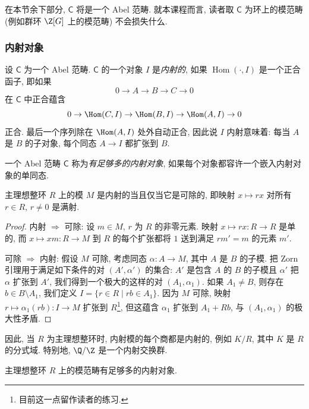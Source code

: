 在本节余下部分, $\mathsf{C}$ 将是一个 Abel 范畴. 就本课程而言, 读者取 $\mathsf{C}$ 为环上的模范畴 (例如群环 $\Z[G]$ 上的模范畴) 不会损失什么.

\subsubsection*{内射对象}

设 $\mathsf{C}$ 为一个 Abel 范畴. $\mathsf{C}$ 的一个对象 $I$ 是\emph{内射的}, 如果 $\operatorname{Hom}(\cdot,I)$ 是一个正合函子, 即如果
\[
 0\to A\to B\to C\to 0
\]
在 $\mathsf{C}$ 中正合蕴含
\[
 0\to \Hom(C,I)\to \Hom(B,I)\to \Hom(A,I)\to 0
\]
正合. 最后一个序列除在 $\Hom(A,I)$ 处外自动正合, 因此说 $I$ 内射意味着: 每当 $A$ 是 $B$ 的子对象, 每个同态 $A\to I$ 都扩张到 $B$.

一个 Abel 范畴 $\mathsf{C}$ 称为\emph{有足够多的内射对象}, 如果每个对象都容许一个嵌入内射对象的单同态.

\begin{proposition}\label{prop:ii.A.3}
主理想整环 $R$ 上的模 $M$ 是内射的当且仅当它是可除的, 即映射 $x\mapsto rx$ 对所有 $r\in R$, $r\neq 0$ 是满射.
\end{proposition}

\begin{proof}
内射 $\Longrightarrow$ 可除: 设 $m\in M$, $r$ 为 $R$ 的非零元素. 映射 $x\mapsto rx\colon R\to R$ 是单的, 而 $x\mapsto xm\colon R\to M$ 到 $R$ 的每个扩张都将 $1$ 送到满足 $rm'=m$ 的元素 $m'$.

可除 $\Longrightarrow$ 内射: 假设 $M$ 可除, 考虑同态 $\alpha\colon A\to M$, 其中 $A$ 是 $B$ 的子模. 把 Zorn 引理用于满足如下条件的对 $(A',\alpha')$ 的集合: $A'$ 是包含 $A$ 的 $B$ 的子模且 $\alpha'$ 把 $\alpha$ 扩张到 $A'$, 我们得到一个极大的这样的对 $(A_1,\alpha_1)$. 如果 $A_1\neq B$, 则存在 $b\in B\setminus A_1$, 我们定义 $I=\{r\in R\mid rb\in A_1\}$. 因为 $M$ 可除, 映射 $r\mapsto \alpha_1(rb)\colon I\to M$ 扩张到 $R$\footnote{目前这一点留作读者的练习.}, 但这蕴含 $\alpha_1$ 扩张到 $A_1+Rb$, 与 $(A_1,\alpha_1)$ 的极大性矛盾.
\end{proof}

因此, 当 $R$ 为主理想整环时, 内射模的每个商都是内射的, 例如 $K/R$, 其中 $K$ 是 $R$ 的分式域. 特别地, $\Q/\Z$ 是一个内射交换群.

\begin{proposition}\label{prop:ii.A.4}
主理想整环 $R$ 上的模范畴有足够多的内射对象.
\end{proposition}

